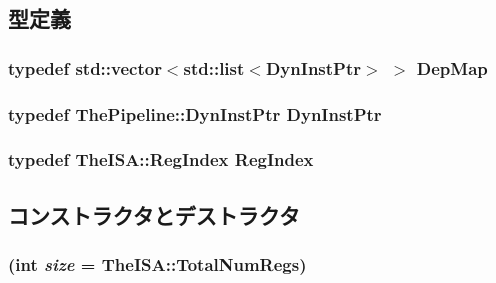 \subsection{型定義}
\hypertarget{classRegDepMap_ac2db38d9150d8b1c9c69bc4f6482a415}{
\subsubsection[{DepMap}]{\setlength{\rightskip}{0pt plus 5cm}typedef {\bf std::vector}$<${\bf std::list}$<${\bf DynInstPtr}$>$ $>$ {\bf DepMap}}}
\label{classRegDepMap_ac2db38d9150d8b1c9c69bc4f6482a415}
\hypertarget{classRegDepMap_af9d0c8a46736ba6aa2d8bb94da1a5e73}{
\subsubsection[{DynInstPtr}]{\setlength{\rightskip}{0pt plus 5cm}typedef {\bf ThePipeline::DynInstPtr} {\bf DynInstPtr}}}
\label{classRegDepMap_af9d0c8a46736ba6aa2d8bb94da1a5e73}
\hypertarget{classRegDepMap_a36d25e03e43fa3bb4c5482cbefe5e0fb}{
\subsubsection[{RegIndex}]{\setlength{\rightskip}{0pt plus 5cm}typedef TheISA::RegIndex {\bf RegIndex}}}
\label{classRegDepMap_a36d25e03e43fa3bb4c5482cbefe5e0fb}


\subsection{コンストラクタとデストラクタ}
\hypertarget{classRegDepMap_a740eadbb74c2858768d7fa7e32e5cafb}{
\subsubsection[{RegDepMap}]{ (int {\em size} = {\ttfamily TheISA::TotalNumRegs})}}
\label{classRegDepMap_a740eadbb74c2858768d7fa7e32e5cafb}



